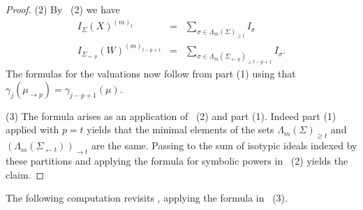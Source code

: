 \documentclass[11pt, reqno]{amsart}
\numberwithin{equation}{section}
\theoremstyle{definition}
\newcommand{\s}{\sigma}
\begin{document}
\begin{proof}
(2) By ~(2) we have
\begin{eqnarray*}
 I_\Sigma(X)^{(m)_t} &=& \sum_{\s\in \Lambda_m(\Sigma)_{\geq t}} I_\s\\
  I_{\Sigma_{\leftarrow p}}(W)^{(m)_{t-p+1}}&=& \sum_{\s\in \Lambda_m(\Sigma_{\leftarrow p})_{\geq {t-p+1}}}I_\s.
\end{eqnarray*}
The formulas for the valuations now follow from part (1) using that $\gamma_j(\mu_{\rightarrow p})=\gamma_{j-p+1}(\mu)$.

(3)
The formula arises as an application of ~(2) and part (1). Indeed part (1) applied with  $p=t$ yields that the minimal elements of the sets $\Lambda_m(\Sigma)_{\geq t}$ and $(\Lambda_m(\Sigma_{\leftarrow t}))_{\rightarrow t}$ are the same. Passing to the sum of isotypic ideals indexed by these partitions and applying the formula for symbolic powers in ~(2) yields the claim.
\end{proof}

The following computation revisits , applying the  formula in  ~(3).
\end{document}
